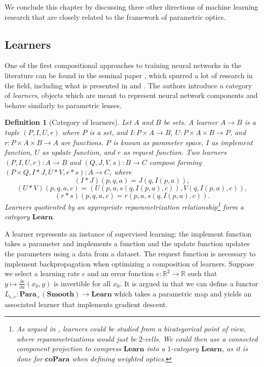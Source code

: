 \documentclass[11pt,a4paper,openright,twoside]{report}
\newcounter{mycounter}
\theoremstyle{plain}
\newtheorem{definition}[mycounter]{Definition}
\theoremstyle{definition}
\begin{document}
We conclude this chapter by discussing three other directions of machine learning research that are closely related to the framework of parametric optics.

\subsection{Learners}

One of the first compositional approaches to training neural networks in the literature can be found in the seminal paper \cite{fong2019backprop}, which spurred a lot of research in the field, including what is presented in \cite{gavranovic2024fundamental} and \cite{cruttwell2022categorical}. The authors introduce a category of \textit{learners}, objects which are meant to represent neural network components and behave similarly to parametric lenses. 

\begin{definition}[Category of learners]
  Let $A$ and $B$ be sets. A learner $A \to B$ is a tuple $(P, I, U, r)$ where $P$ is a set, and $I: P \times A \to B$, $U: P \times A \times B \to P$, and $r: P \times A \times B \to A$ are functions.
  $P$ is known as parameter space, $I$ as implement function, $U$ as update function, and $r$ as request function. Two learners $(P, I, U, r): A \to B$ and $(Q, J, V, s): B \to C$ compose forming $(P \times Q, I \ast J, U \ast V, r \ast s ): A \to C$, where
  \[(I \ast J)(p,q,a) = J(q,I(p,a)),\]
  \[(U \ast V)(p,q,a,c) = (U(p,a,s(q,I(p,a),c)), V(q,I(p,a),c)),\]
  \[(r \ast s)(p,q,a,c) = r(p,a,s(q,I(p,a),c)).\]
  Learners quotiented by an appropriate reparametrization relationship\footnote{As argued in \cite{fong2019backprop}, learners could be studied from a bicategorical point of view, where reparametrizations would just be $2$-cells. We could then use a connected component projection to compress $\mathbf{Learn}$ into a $1$-category $\mathbf{Learn}$, as it is done for $\mathbf{coPara}$ when defining weighted optics.} form a category $\mathbf{Learn}$.
\end{definition}

A learner represents an instance of supervised learning: the implement function takes a parameter and implements a function and the update function updates the parameters using a data from a dataset. The request function is necessary to implement backpropagation when optimizing a composition of learners. Suppose we select a learning rate $\epsilon$ and an error function $e: \mathbb{R}^2 \to \mathbb{R}$ such that $y \mapsto \frac{\partial e }{\partial x}(x_0, y)$ is invertible for all $x_0$. It is argued in \cite{fong2019backprop} that we can define a functor $L_{\epsilon, e}: \mathbf{Para}_{\times}(\mathbf{Smooth}) \to \mathbf{Learn}$ which takes a parametric map and yields an associated learner that implements gradient descent. 
\end{document}
